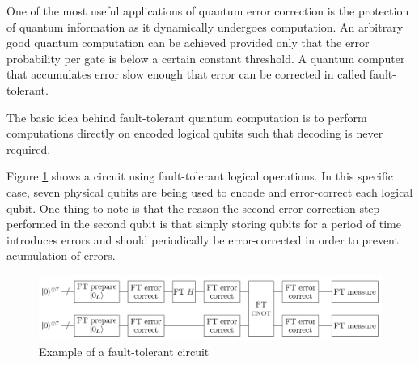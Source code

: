 One of the most useful applications of quantum error correction is the protection of quantum information as it dynamically undergoes computation. An arbitrary good quantum computation can be achieved provided only that the error probability per gate is below a certain constant threshold. A quantum computer that accumulates error slow enough that error can be corrected in called fault-tolerant.

The basic idea behind fault-tolerant quantum computation is to perform computations directly on encoded logical qubits such that decoding is never required.

Figure \ref{fig:FaultTolerantCircuit} shows a circuit using fault-tolerant logical operations. In this specific case, seven physical qubits are being used to encode and error-correct each logical qubit. One thing to note is that the reason the second error-correction step performed in the second qubit is that simply storing qubits for a period of time introduces errors and should periodically be error-corrected in order to prevent acumulation of errors.

\begin{figure}[h!]
    \centering
    \includegraphics[scale=.30]{images/ErrorCorrection-FaultTolerantCircuit.png}
    \caption{Example of a fault-tolerant circuit \cite{NielsenChuang_2012}}
    \label{fig:FaultTolerantCircuit}
\end{figure}
